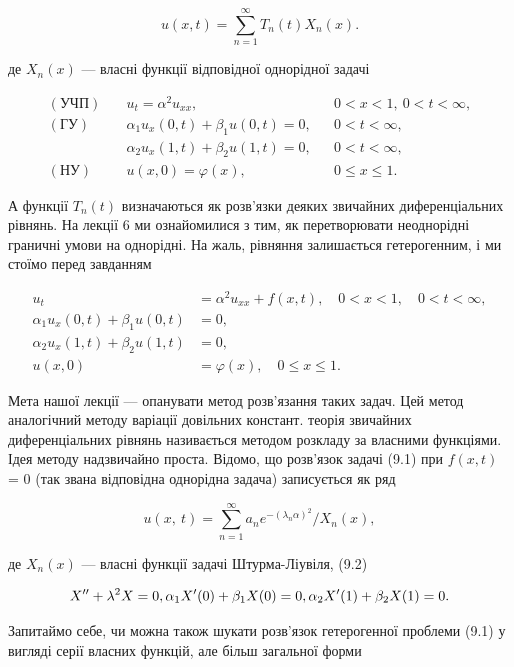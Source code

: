 \documentclass[
  ukrainian,
]{article}
\begin{document}
\[
u(x,t) = \sum_{n=1}^{\infty} T_n(t) X_n(x).
\]

де \(X_n(x)\) --- власні функції відповідної однорідної задачі

\[
\begin{aligned}
(\text{УЧП})\quad & u_t = \alpha^2 u_{xx}, && 0 < x < 1,\ 0 < t < \infty, \\
(\text{ГУ})\quad & \alpha_1 u_x(0,t) + \beta_1 u(0,t) = 0, && 0 < t < \infty, \\
& \alpha_2 u_x(1,t) + \beta_2 u(1,t) = 0, && 0 < t < \infty, \\
(\text{НУ})\quad & u(x,0) = \varphi(x), && 0 \leqslant x \leqslant 1.
\end{aligned}
\]

А функції \(T_n(t)\) визначаються як розв'язки деяких звичайних
диференціальних рівнянь. На лекції 6 ми ознайомилися з тим, як
перетворювати неоднорідні граничні умови на однорідні. На жаль, рівняння
залишається гетерогенним, і ми стоїмо перед завданням

\[
\begin{aligned}
u_{t} &= \alpha^{2} u_{xx} + f(x, t), \quad 0 < x < 1, \quad 0 < t < \infty,\\
\alpha_{1} u_{x}(0, t) + \beta_{1} u(0, t) &= 0, \\
\alpha_{2} u_{x}(1, t) + \beta_{2} u(1, t) &= 0, \\
u(x, 0) &= \varphi(x), \quad 0 \le x \le 1.
\end{aligned}
\]

Мета нашої лекції --- опанувати метод розв'язання таких задач. Цей метод
аналогічний методу варіації довільних констант. теорія звичайних
диференціальних рівнянь називається методом розкладу за власними
функціями. Ідея методу надзвичайно проста. Відомо, що розв'язок задачі
(9.1) при \(f(x, t)\) = 0 (так звана відповідна однорідна задача)
записується як ряд

\[
u\left(x,\ t\right)=\sum_{n=1}^{\infty}a_{n}e^{-\left(\lambda_{n}\alpha\right)^{2}}/X_{n}\left(x\right),
\]

де \(X_n(x)\) --- власні функції задачі Штурма-Ліувіля, (9.2)

\[
X'' + \lambda^2 X = 0, \\ \alpha_1 X'(0) + \beta_1 X(0) = 0, \\ \alpha_2 X'(1) + \beta_2 X(1) = 0.
\]

Запитаймо себе, чи можна також шукати розв'язок гетерогенної проблеми
(9.1) у вигляді серії власних функцій, але більш загальної форми
\end{document}
